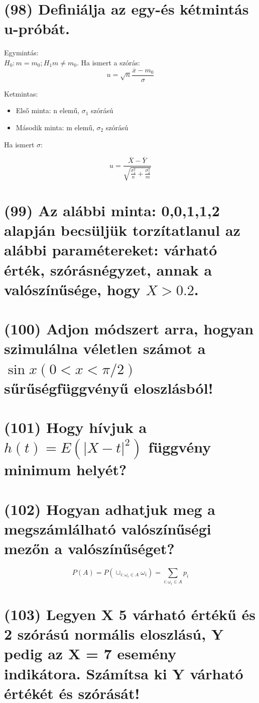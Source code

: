 \documentclass[12p]{article}
\begin{document}
\section{(98) Definiálja az egy-és kétmintás u-próbát.}

Egymintás:\\
$H_0: m=m_0; H_1 m \neq m_0$. Ha ismert a szórás:
$$u = \sqrt{n}\frac{\overline{x} - m_0}{\sigma}$$

Ketmintas:
\begin{itemize}
	\item Első minta: n elemű, $\sigma_1$ szórású
	\item Második minta: m elemű, $\sigma_2$ szórású
\end{itemize}

Ha ismert $\sigma$:

$$u = \frac{\overline{X} - \overline{Y}}{\sqrt{\frac{\sigma^2_1}{n} + \frac{\sigma^2_2}{m}}}$$

\section{(99) Az alábbi minta: 0,0,1,1,2 alapján becsüljük torzítatlanul az alábbi paramétereket:
várható érték, szórásnégyzet, annak a valószínűsége, hogy $X > 0.2$.}

\section{(100) Adjon módszert arra, hogyan szimulálna véletlen számot a $\sin x (0 < x < \pi/2)$ sűrűségfüggvényű eloszlásból!}

\section{(101) Hogy hívjuk a $h(t) = E(|X - t|^2)$ függvény minimum helyét?}

\section{(102) Hogyan adhatjuk meg a megszámlálható valószínűségi mezőn a valószínűséget?}

$$P(A) = P(\cup_{i:\omega_i \in A} \omega_i) = \sum_{i:\omega_i \in A} p_i$$

\section{(103) Legyen X 5 várható értékű és 2 szórású normális eloszlású, Y pedig az X = 7 esemény indikátora. Számítsa ki Y várható értékét és szórását!}
\end{document}
